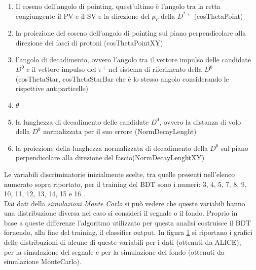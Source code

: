 \begin{enumerate}
            \item Il coseno dell'angolo di pointing, quest'ultimo è l'angolo tra la retta congiungente il PV e il SV e la direzione del $p_T$ della $D^{*+}$ (cosThetaPoint)
            \item \textbf la proiezione del coseno dell'angolo di pointing sul piano perpendicolare alla direzione dei fasci di protoni (cosThetaPointXY)
            \item l'angolo di decadimento, ovvero l'angolo tra il vettore impulso delle candidate $D^0$ e il vettore impulso del $\pi^+$ nel sistema di riferimento della $D^0$ (cosThetaStar, cosThetaStarBar che \`e lo stesso angolo considerando le rispettive antiparticelle)
            \item $\theta$ 
            \item la lunghezza di decadimento delle candidate $D^0$, ovvero la distanza di volo della $D^0$ normalizzata per il suo errore (NormDecayLenght)
            \item la proiezione della lunghezza normalizzata di decadimento della $D^0$ sul piano perpendicolare alla direzione del fascio(NormDecayLenghtXY)
        \end{enumerate}
       
   Le variabili discriminatorie inizialmente scelte, tra quelle presenti nell'elenco numerato sopra riportato, per il training del BDT sono i numeri: 3, 4, 5, 7, 8, 9, 10, 11, 12, 13, 14, 15 e 16 .      
   \\Dai dati della \textit{simulazioni Monte Carlo} si può vedere che queste variabili hanno una distribuzione diversa nel caso si consideri il segnale o il fondo. Proprio in base a queste differenze l'algoritmo utilizzato per questa analisi costruisce il BDT fornendo, alla fine del training, il classifier output. In figura \ref{fig:variabilitaglio} si riportano i grafici delle distribuzioni di alcune di queste variabili per i dati (ottenuti da ALICE), per la simulazione del segnale e per la simulazione del fondo (ottenuti da simulazione MonteCarlo).
   
    \begin{figure}[htbp] %
        \centering
        \caption{}
        \label{fig:variabilitaglio}
    \end{figure}
    
